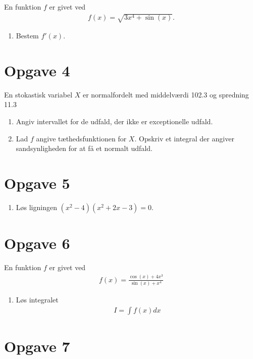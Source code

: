 \documentclass[12pt]{article}
\begin{document}
	En funktion $f$ er givet ved
	\begin{align*}
		f(x) = \sqrt{3x^4+\sin(x)}.
	\end{align*}

\begin{enumerate}[label=\roman*)]
	\item	Bestem $f'(x)$.
\end{enumerate}

\section*{Opgave 4}

En stokastisk variabel $X$ er normalfordelt med middelværdi 102.3 og spredning 11.3


\begin{enumerate}[label=\roman*)]
	\item	Angiv intervallet for de udfald, der ikke er exceptionelle udfald. 
	\item	Lad $f$ angive tæthedsfunktionen for $X$. Opskriv et integral der angiver sandsynligheden for at få et normalt udfald.
\end{enumerate}

\section*{Opgave 5}

\begin{enumerate}[label=\roman*)]
	\item Løs ligningen $(x^2-4)(x^2+2x-3)=0$.
\end{enumerate}

\section*{Opgave 6}

En funktion $f$ er givet ved
\begin{align*}
	f(x) = \frac{\cos(x)+4x^3}{\sin(x)+x^4}
\end{align*}
\begin{enumerate}[label=\roman*)]
	\item Løs integralet
	\begin{align*}
		I = \int f(x) dx
	\end{align*}
\end{enumerate}

\section*{Opgave 7}
\end{document}
